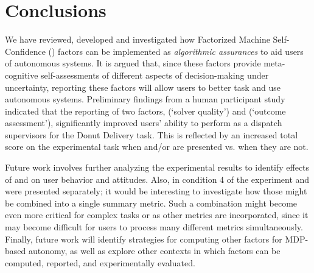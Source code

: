\section{Conclusions} \label{sec:conclusions}
%
We have reviewed, developed and investigated how Factorized Machine Self-Confidence (\famsec{}) factors can be implemented as \emph{algorithmic assurances} to aid users of autonomous systems. It is argued that, since these factors provide meta-cognitive self-assessments of different aspects of decision-making under uncertainty, reporting these factors will allow users to better task and use autonomous systems.  Preliminary findings from a human participant study indicated that the reporting of two \famsec{} factors, \xQ{} (`solver quality') and \xO{} (`outcome assessment'), significantly improved users' ability to perform as a dispatch supervisors for the Donut Delivery task. This is reflected by an increased total score on the experimental task when \xQ{} and/or \xO{} are presented vs. when they are not.

Future work involves further analyzing the experimental results to identify effects of \xQ{} and \xO{} on user behavior and attitudes. Also, in condition 4 of the experiment \xQ{} and \xO{} were presented separately; it would be interesting to investigate how those might be combined into a single summary metric. Such a combination might become even more critical for complex tasks or as other \famsec{} metrics are incorporated, since it may become difficult for users to process many different metrics simultaneously. Finally, future work will identify strategies for computing other \famsec{} factors for MDP-based autonomy, as well as explore other contexts in which \famsec{} factors can be computed, reported, and experimentally evaluated.  %
